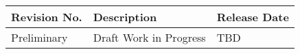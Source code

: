 \sffamily
\bfseries
{}
\normalfont
\centering
\begin{table}[htbp]
\begin{minipage}{\linewidth}
\setlength{\tymax}{0.5\linewidth}
\centering
\small
\begin{tabular}{| >{\centering\arraybackslash}m{1.25in}| >{\centering\arraybackslash}m{2.95in}| >{\centering\arraybackslash}m{1.5in}|} \hline
\bfseries{Revision No.} & \bfseries{Description} & \bfseries{Release Date}\\
\hline
Preliminary & Draft Work in Progress & TBD \\
\hline
\end{tabular}
\end{minipage}
\end{table}

\clearpage
